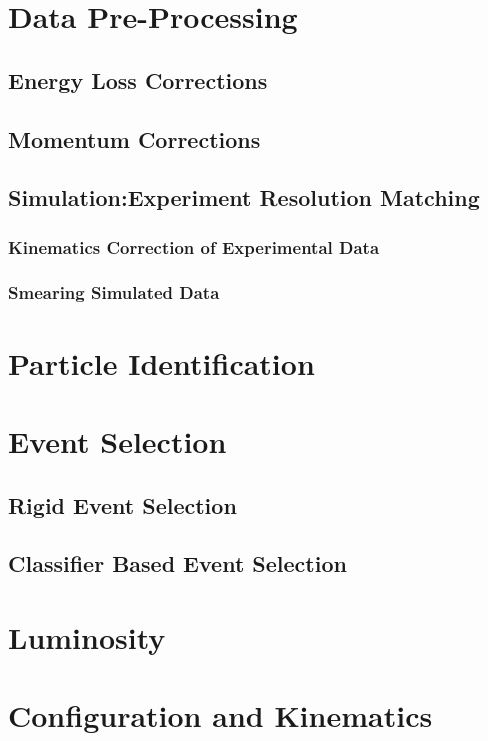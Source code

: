 \section{Data Pre-Processing}
    \subsection{Energy Loss Corrections}
    \subsection{Momentum Corrections}
    \subsection{Simulation:Experiment Resolution Matching}
        \subsubsection{Kinematics Correction of Experimental Data}
        \subsubsection{Smearing Simulated Data}

\section{Particle Identification}

\section{Event Selection}
    \subsection{Rigid Event Selection}
    \subsection{Classifier Based Event Selection}

\section{Luminosity}

\section{Configuration and Kinematics}

